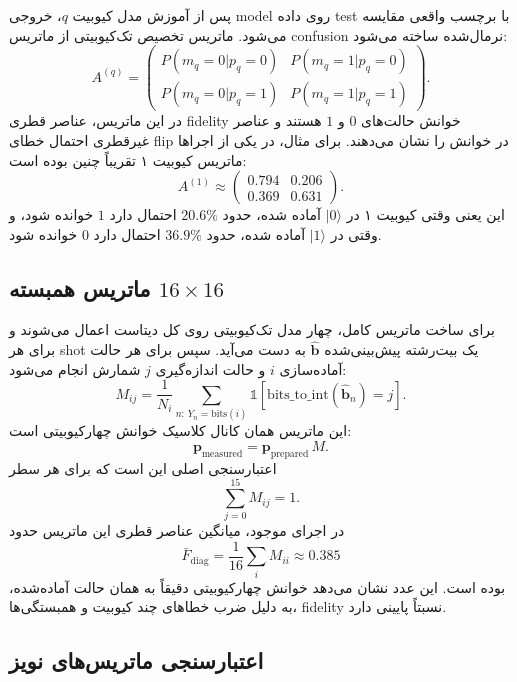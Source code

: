 پس از آموزش مدل کیوبیت $q$، خروجی model روی داده test با برچسب واقعی مقایسه می‌شود. ماتریس تخصیص تک‌کیوبیتی از ماتریس confusion نرمال‌شده ساخته می‌شود:
\begin{equation}
	A^{(q)}=
	\begin{pmatrix}
	P(m_q=0|p_q=0) & P(m_q=1|p_q=0)\\
	P(m_q=0|p_q=1) & P(m_q=1|p_q=1)
	\end{pmatrix}.
	\label{eq:single-assignment}
\end{equation}
در این ماتریس، عناصر قطری fidelity خوانش حالت‌های $0$ و $1$ هستند و عناصر غیرقطری احتمال خطای flip در خوانش را نشان می‌دهند. برای مثال، در یکی از اجراها ماتریس کیوبیت ۱ تقریباً چنین بوده است:
\[
	A^{(1)}\approx
	\begin{pmatrix}
	0.794 & 0.206\\
	0.369 & 0.631
	\end{pmatrix}.
\]
این یعنی وقتی کیوبیت ۱ در $|0\rangle$ آماده شده، حدود $20.6\%$ احتمال دارد $1$ خوانده شود، و وقتی در $|1\rangle$ آماده شده، حدود $36.9\%$ احتمال دارد $0$ خوانده شود.

\subsection{ماتریس همبسته $16\times16$}

برای ساخت ماتریس کامل، چهار مدل تک‌کیوبیتی روی کل دیتاست اعمال می‌شوند و برای هر shot یک بیت‌رشته پیش‌بینی‌شده $\hat{\mathbf{b}}$ به دست می‌آید. سپس برای هر حالت آماده‌سازی $i$ و حالت اندازه‌گیری $j$ شمارش انجام می‌شود:
\begin{equation}
	M_{ij}
	=
	\frac{1}{N_i}
	\sum_{n:\,Y_n=\mathrm{bits}(i)}
	\mathbb{1}\left[
	\mathrm{bits\_to\_int}(\hat{\mathbf{b}}_n)=j
	\right].
	\label{eq:full-matrix}
\end{equation}
این ماتریس همان کانال کلاسیک خوانش چهارکیوبیتی است:
\[
	\mathbf{p}_{\mathrm{measured}}
	=
	\mathbf{p}_{\mathrm{prepared}}\,M.
\]
اعتبارسنجی اصلی این است که برای هر سطر
\[
	\sum_{j=0}^{15} M_{ij}=1.
\]
در اجرای موجود، میانگین عناصر قطری این ماتریس حدود
\[
	\bar{F}_{\mathrm{diag}}=\frac{1}{16}\sum_i M_{ii}\approx0.385
\]
بوده است. این عدد نشان می‌دهد خوانش چهارکیوبیتی دقیقاً به همان حالت آماده‌شده، به دلیل ضرب خطاهای چند کیوبیت و همبستگی‌ها، fidelity نسبتاً پایینی دارد.

\subsection{اعتبارسنجی ماتریس‌های نویز}

